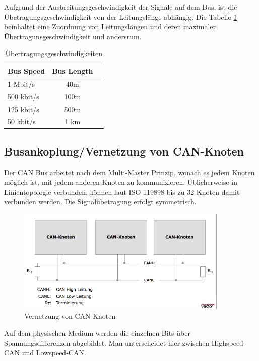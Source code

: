 Aufgrund der Ausbreitungsgeschwindigkeit der Signale auf dem Bus, ist die 
Übetragungsgeschwindigkeit von der Leitungslänge abhängig. Die Tabelle 
\ref{tab:speed} beinhaltet eine Zuordnung von Leitungslängen und deren 
maximaler Übertragunsgeschwindigkeit und andersrum.

\begin{table}[h]
	\centering
	\begin{tabular}{lcr}
		Bus Speed & Bus Length \\
		\hline
		1 Mbit/s & 40m \\
		500 kbit/s & 100m \\
		125 kbit/s & 500m \\
		50 kbit/s & 1 km \\
	\end{tabular}
	\label{tab:speed}
	\caption{Übertragungsgeschwindigkeiten}
\end{table}

\subsection{Busankoplung/Vernetzung von CAN-Knoten}

Der CAN Bus arbeitet nach dem Multi-Master Prinzip, wonach es jedem Knoten 
möglich ist, mit jedem anderen Knoten zu kommunizieren. Üblicherweise in 
Linientopologie verbunden, können laut ISO 119898 bis zu 32 Knoten damit
verbunden werden. Die Signalübetragung erfolgt symmetrisch.

\begin{figure}[h] 
\centering
\includegraphics[width=0.9\textwidth]{figures/cannet}
\caption{Vernetzung von CAN Knoten \citep{VEC}} 
\label{data}
\end{figure} 

Auf dem physischen Medium werden die einzelnen Bits über Spannungsdifferenzen
abgebildet. Man unterscheidet hier zwischen Highspeed-CAN und Lowspeed-CAN.

